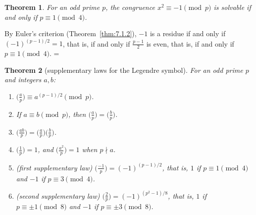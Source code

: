 \documentclass[11pt]{article}
\makeatletter
\let\nt@closedisplay\]
\def\nt@guardedclose{\@ifnextchar\par{\nt@closeafterpar}{\@ifnextchar\end{\postdisplaypenalty\@M\nt@closedisplay}{\nt@closedisplay}}}
\def\nt@closeafterpar\par{\@ifnextchar\par{\nt@closeafterpar}{\@ifnextchar\end{\postdisplaypenalty\@M\nt@closedisplay\par}{\nt@closedisplay\par}}}
\renewenvironment{proof}[1][\proofname]{\par
  \pushQED{\qed}\normalfont\topsep\medskipamount\edef\nt@afterproof{\@endparpenalty=\the\@endparpenalty\relax}\@beginparpenalty\@M\@endparpenalty\@M\let\]\nt@guardedclose\trivlist\item[]\textit{#1\@addpunct{.}} \ignorespaces}{\ifvmode\addpenalty\@M\fi\popQED\nt@afterproof\endtrivlist\@endpefalse}
\theoremstyle{ntstyle}
\newtheorem{theorem}{Theorem}[subsection]
\newcommand{\legs}[2]{\bigl(\tfrac{#1}{#2}\bigr)}
\makeatother
\begin{document}
\begin{theorem}\label{thm:7.2.4} For an odd
  prime $p$, the congruence $x^{2} \equiv -1 \pmod{p}$ is solvable if and
  only if $p \equiv 1 \pmod{4}$.

\end{theorem}

\begin{proof} By Euler's criterion (Theorem~\ref{thm:7.1.2}), $-1$ is a residue if
  and only if $(-1)^{(p-1)/2} = 1$, that is, if and only if
  $\tfrac{p-1}{2}$ is even, that is, if and only if $p \equiv 1 \pmod{4}$.
\end{proof}

\begin{theorem}[supplementary laws for the Legendre symbol]\label{thm:7.2.5}\label{thm:supplementary-laws-for-the-legendre-symbol}
  For an odd prime $p$
  and integers $a, b$:

  \begin{enumerate}[label={\alph*)}]
    \item $\legs{a}{p} \equiv a^{(p-1)/2} \pmod{p}$.

    \item If $a \equiv b \pmod{p}$, then $\legs{a}{p} = \legs{b}{p}$.

    \item $\legs{ab}{p} = \legs{a}{p}\legs{b}{p}$.

    \item $\legs{1}{p} = 1$, and $\legs{a^{2}}{p} = 1$ when $p \nmid a$.

    \item (first supplementary law) $\legs{-1}{p} = (-1)^{(p-1)/2}$, that is,
          $1$ if $p \equiv 1 \pmod{4}$ and $-1$ if $p \equiv 3 \pmod{4}$.

    \item (second supplementary law) $\legs{2}{p} = (-1)^{(p^{2}-1)/8}$, that
          is, $1$ if $p \equiv \pm 1 \pmod{8}$ and $-1$ if $p \equiv \pm 3 \pmod{8}$.
  \end{enumerate}

\end{theorem}
\end{document}
